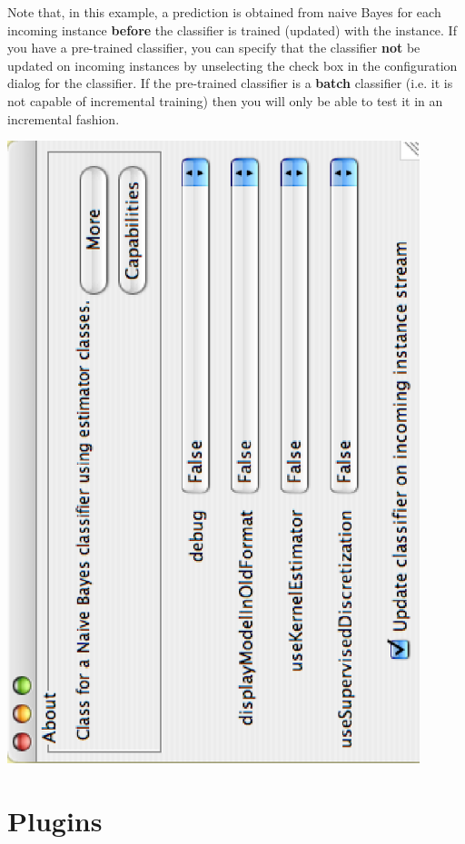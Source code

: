 Note that, in this example, a prediction is obtained from naive Bayes
for each incoming instance {\bf before} the classifier is trained
(updated) with the instance. If you have a pre-trained classifier, you
can specify that the classifier {\bf not} be updated on incoming
instances by unselecting the check box in the configuration dialog for
the classifier. If the pre-trained classifier is a {\bf batch}
classifier (i.e. it is not capable of incremental training) then you
will only be able to test it in an incremental fashion.

\begin{center}
  \includegraphics[angle=270,width=12cm]{images/knowledgeflow/IncrementalClassifierConfig.eps}
\end{center}

\newpage
\section{Plugins}

